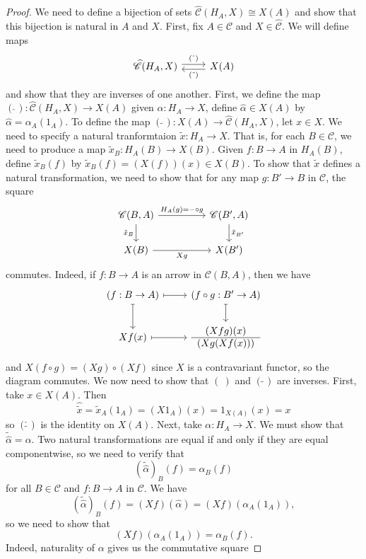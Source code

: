 \documentclass[10pt,oneside]{book}
\def\~#1{\mathscr{#1}}
\def\pre#1{\widehat{#1}}
\theoremstyle{plain}
\theoremstyle{definition}
\theoremstyle{remark}
\numberwithin{equation}{section}
\numberwithin{figure}{section}
\begin{document}
\begin{proof}

We need to define a bijection of sets $\pre{\~C}(H_A, X) \cong X(A)$ and show that this bijection is natural in $A$ and $X$. First, fix $A \in \~C$ and $X \in \pre{\~C}$. We will define maps 
\[\begin{tikzcd}
    {\pre{\~C}(H_A,X) } & {X(A)}
    \arrow["{(\hat{~})}", shift left, from=1-1, to=1-2]
    \arrow["{(\tilde{~})}", shift left, from=1-2, to=1-1]
\end{tikzcd}\]
and show that they are inverses of one another. First, we define the map $(\hat{~}): \pre{\~C}(H_A,X) \to X(A)$ given $\alpha: H_A \to X$, define $\hat{\alpha} \in X(A)$ by $\hat{\alpha} = \alpha_A(1_A)$. To define the map $(\tilde{~}): X(A) \to \pre{\~C}(H_A,X)$, let $x \in X$. We need to specify a natural tranformtaion $\tilde{x}: H_A \to X$. That is, for each $B \in \~C$, we need to produce a map $\tilde{x}_B: H_A(B) \to X(B)$. Given $f: B \to A$  in $H_A(B)$, define $\tilde{x}_B(f)$ by $\tilde{x}_B(f) = (X(f))(x) \in X(B)$. To show that $\tilde{x}$ defines a natural transformation, we need to show that for any map $g: B' \to B$ in $\~C$, the square
\[\begin{tikzcd}
    {\~C(B, A)} && {\~C(B',A)} \\
    {X(B)} && {X(B')}
    \arrow["{H_A(g)= -\circ g}", from=1-1, to=1-3]
    \arrow["{\tilde{x}_B}"', from=1-1, to=2-1]
    \arrow["{\tilde{x}_{B'}}", from=1-3, to=2-3]
    \arrow["Xg"', from=2-1, to=2-3]
\end{tikzcd}\]
commutes. Indeed, if $f: B \to A$ is an arrow in $\~C(B, A)$, then we have
\[\begin{tikzcd}
    {(f: B \to A)} & {(f \circ g: B' \to A)} \\
    {Xf(x)} & {\begin{tabular}{c} $(Xfg)(x)$ \\ \hline $(Xg(Xf(x)))$ \end{tabular}}
    \arrow[maps to, from=1-1, to=1-2]
    \arrow[maps to, from=1-1, to=2-1]
    \arrow[maps to, from=1-2, to=2-2]
    \arrow[maps to, from=2-1, to=2-2]
\end{tikzcd}\]
and $X(f \circ g) = (Xg) \circ (Xf)$ since $X$ is a contravariant functor, so the diagram commutes. We now need to show that $(\hat{~})$ and $(\tilde{~})$ are inverses. First, take $x \in X(A)$. Then 
\[\hat{\tilde{x}} = \tilde{x}_A(1_A) = (X1_A)(x) = 1_{X(A)}(x) = x\]
so $(\hat{\tilde{~}})$ is the identity on $X(A)$. Next, take $\alpha: H_A \to X$. We must show that $\tilde{\hat{\alpha}} = \alpha$. Two natural transformations are equal if and only if they are equal componentwise, so we need to verify that
\[(\tilde{\hat{\alpha}})_B(f) = \alpha_B(f)\]
for all $B \in \~C$ and $f: B \to A$ in $\~C$. We have
\[(\tilde{\hat{\alpha}})_B(f) = (Xf)(\hat{\alpha}) = (Xf)(\alpha_A(1_A)),\]
so we need to show that 
\begin{equation}
    \label{eq:3.2.1}
    (Xf)(\alpha_A(1_A)) = \alpha_B(f).
\end{equation}
Indeed, naturality of $\alpha$ gives us the commutative square
\end{proof}
\end{document}
